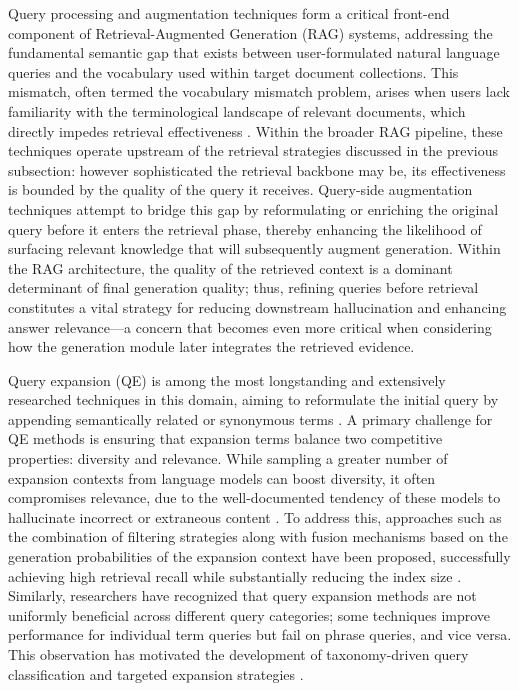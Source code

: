 \documentclass[11pt]{article}
\begin{document}
Query processing and augmentation techniques form a critical front-end component of Retrieval-Augmented Generation (RAG) systems, addressing the fundamental semantic gap that exists between user-formulated natural language queries and the vocabulary used within target document collections. This mismatch, often termed the vocabulary mismatch problem, arises when users lack familiarity with the terminological landscape of relevant documents, which directly impedes retrieval effectiveness \cite{ref22}. Within the broader RAG pipeline, these techniques operate upstream of the retrieval strategies discussed in the previous subsection: however sophisticated the retrieval backbone may be, its effectiveness is bounded by the quality of the query it receives. Query-side augmentation techniques attempt to bridge this gap by reformulating or enriching the original query before it enters the retrieval phase, thereby enhancing the likelihood of surfacing relevant knowledge that will subsequently augment generation. Within the RAG architecture, the quality of the retrieved context is a dominant determinant of final generation quality; thus, refining queries before retrieval constitutes a vital strategy for reducing downstream hallucination and enhancing answer relevance---a concern that becomes even more critical when considering how the generation module later integrates the retrieved evidence.

Query expansion (QE) is among the most longstanding and extensively researched techniques in this domain, aiming to reformulate the initial query by appending semantically related or synonymous terms \cite{ref23}. A primary challenge for QE methods is ensuring that expansion terms balance two competitive properties: diversity and relevance. While sampling a greater number of expansion contexts from language models can boost diversity, it often compromises relevance, due to the well-documented tendency of these models to hallucinate incorrect or extraneous content \cite{ref24}. To address this, approaches such as the combination of filtering strategies along with fusion mechanisms based on the generation probabilities of the expansion context have been proposed, successfully achieving high retrieval recall while substantially reducing the index size \cite{ref24}. Similarly, researchers have recognized that query expansion methods are not uniformly beneficial across different query categories; some techniques improve performance for individual term queries but fail on phrase queries, and vice versa. This observation has motivated the development of taxonomy-driven query classification and targeted expansion strategies \cite{ref25}.
\end{document}

